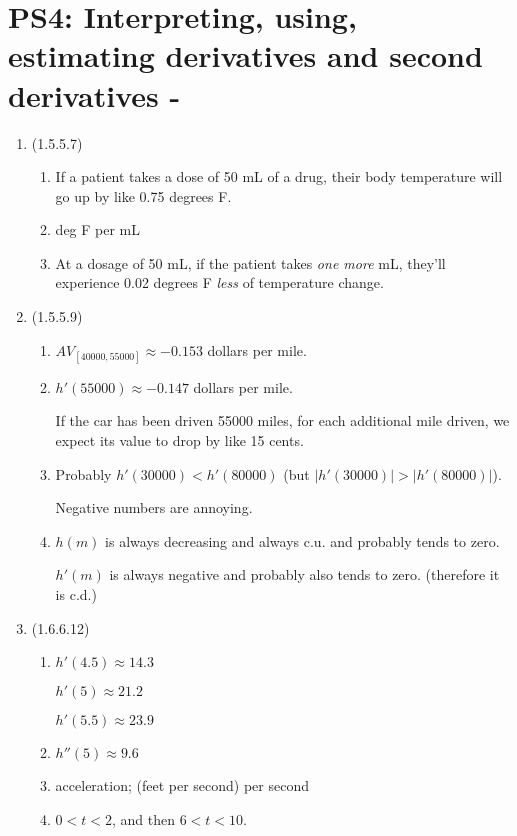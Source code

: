 


%


\allowdisplaybreaks
\section{PS4: Interpreting, using, estimating derivatives and second derivatives  -  }


\everymath{\displaystyle}
\begin{enumerate}[leftmargin=0pt]

\item (1.5.5.7)
\begin{enumerate}
    \item If a patient takes a dose of 50 mL of a drug, their body temperature will go up by like 0.75 degrees F.
    \item deg F per mL
    \item At a dosage of 50 mL, if the patient takes \textit{one more} mL, they'll experience 0.02 degrees F \textit{less} of temperature change.
\end{enumerate}

\item (1.5.5.9)
\begin{enumerate}
    \item $AV_{[40000, 55000]} \approx -0.153$ dollars per mile.
    \item $h'(55000) \approx -0.147$ dollars per mile. 

    If the car has been driven 55000 miles, for each additional mile driven, we expect its value to drop by like 15 cents.

    \item Probably $h'(30000) < h'(80000)$ (but $|h'(30000)| > |h'(80000)|$).
    
    Negative numbers are annoying.

    \item $h(m)$ is always decreasing and always c.u. and probably tends to zero.

    $h'(m)$ is always negative and probably also tends to zero. (therefore it is c.d.)
\end{enumerate}

\item (1.6.6.12)
\begin{enumerate}
    \item $h'(4.5) \approx 14.3$
    
    $h'(5) \approx 21.2$

    $h'(5.5) \approx \mathbf{23.9}$
    \item $h''(5) \approx 9.6$
    \item acceleration; (feet per second) per second
    \item $0 < t < 2$, and then $6 < t < 10$.
\end{enumerate}

\end{enumerate}


